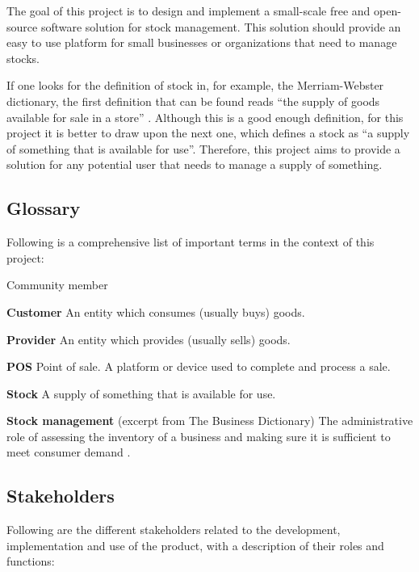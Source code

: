 The goal of this project is to design and implement a small-scale free and open-source software solution for stock management. This solution should provide an easy to use platform for small businesses or organizations that need to manage stocks.

If one looks for the definition of stock in, for example, the Merriam-Webster dictionary, the first definition that can be found reads “the supply of goods available for sale in a store” \cite{1}. Although this is a good enough definition, for this project it is better to draw upon the next one, which defines a stock as “a supply of something that is available for use”. Therefore, this project aims to provide a solution for any potential user that needs to manage a supply of something.

\subsection{Glossary}
Following is a comprehensive list of important terms in the context of this project:

\begin{labeling}{Community member}
\item[\textbf{Customer}]{An entity which consumes (usually buys) goods.}
\item[\textbf{Provider}]{An entity which provides (usually sells) goods.}
\item[\textbf{POS}]{Point of sale. A platform or device used to complete and process a sale.}
\item[\textbf{Stock}]{A supply of something that is available for use.}
\item[\textbf{Stock management}]{(excerpt from The Business Dictionary) The administrative role of assessing the inventory of a business and making sure it is sufficient to meet consumer demand \cite{3}.}
\end{labeling}

\subsection{Stakeholders}
Following are the different stakeholders related to the development, implementation and use of the product, with a description of their roles and functions:

